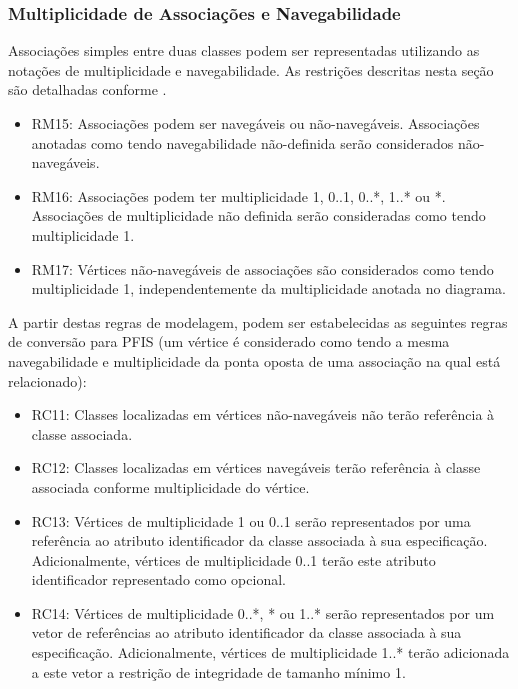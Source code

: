 
\subsubsection{Multiplicidade de Associações e Navegabilidade}

Associações simples entre duas classes podem ser representadas utilizando as notações de multiplicidade e navegabilidade. As restrições descritas nesta seção são detalhadas conforme .

\begin{itemize}
    \item RM15: Associações podem ser navegáveis ou não-navegáveis. Associações anotadas como tendo navegabilidade não-definida serão considerados não-navegáveis.

    \item RM16: Associações podem ter multiplicidade 1, 0..1, 0..*, 1..* ou *. Associações de multiplicidade não definida serão consideradas como tendo multiplicidade 1.

    \item RM17: Vértices não-navegáveis de associações são considerados como tendo multiplicidade 1, independentemente da multiplicidade anotada no diagrama.
\end{itemize}

A partir destas regras de modelagem, podem ser estabelecidas as seguintes regras de conversão para PFIS (um vértice é considerado como tendo a mesma navegabilidade e multiplicidade da ponta oposta de uma associação na qual está relacionado):

\begin{itemize}
    \item RC11: Classes localizadas em vértices não-navegáveis não terão referência à classe associada.

    \item RC12: Classes localizadas em vértices navegáveis terão referência à classe associada conforme multiplicidade do vértice.

    \item RC13: Vértices de multiplicidade 1 ou 0..1 serão representados por uma referência ao atributo identificador da classe associada à sua especificação. Adicionalmente, vértices de multiplicidade 0..1 terão este atributo identificador representado como opcional.

    \item RC14: Vértices de multiplicidade 0..*, * ou 1..* serão representados por um vetor de referências ao atributo identificador da classe associada à sua especificação. Adicionalmente, vértices de multiplicidade 1..* terão adicionada a este vetor a restrição de integridade de tamanho mínimo 1.
\end{itemize}

